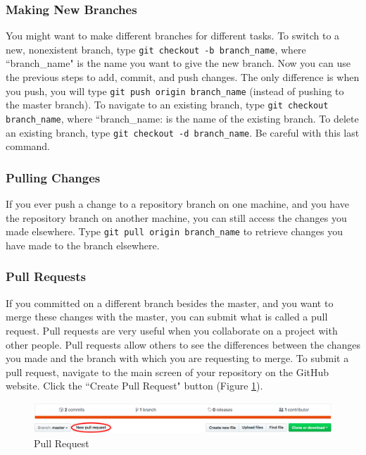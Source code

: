 \documentclass[11pt,a4paper]{article}
\begin{document}
\subsubsection*{Making New Branches}
You might want to make different branches for different tasks.
To switch to a new, nonexistent branch, type \texttt{git checkout -b branch\_name}, where ``branch\_name" is the name you want to give the new branch.
Now you can use the previous steps to add, commit, and push changes.
The only difference is when you push, you will type \texttt{git push origin branch\_name} (instead of pushing to the master branch).
To navigate to an existing branch, type \texttt{git checkout branch\_name}, where ``branch\_name: is the name of the existing branch.
To delete an existing branch, type \texttt{git checkout -d branch\_name}.
Be careful with this last command.

\subsubsection*{Pulling Changes}
If you ever push a change to a repository branch on one machine, and you have the repository branch on another machine, you can still access the changes you made elsewhere.
Type \texttt{git pull origin branch\_name} to retrieve changes you have made to the branch elsewhere.

\subsubsection*{Pull Requests}
If you committed on a different branch besides the master, and you want to merge these changes with the master, you can submit what is called a pull request.
Pull requests are very useful when you collaborate on a project with other people.
Pull requests allow others to see the differences between the changes you made and the branch with which you are requesting to merge.
To submit a pull request, navigate to the main screen of your repository on the GitHub website.
Click the ``Create Pull Request" button (Figure \ref{fig:pull-request}).

\begin{figure}[h!]
\centering
\includegraphics[width=.7\textwidth]{figures/pull_request.png}
\caption{Pull Request}
\label{fig:pull-request}
\end{figure}
\end{document}
